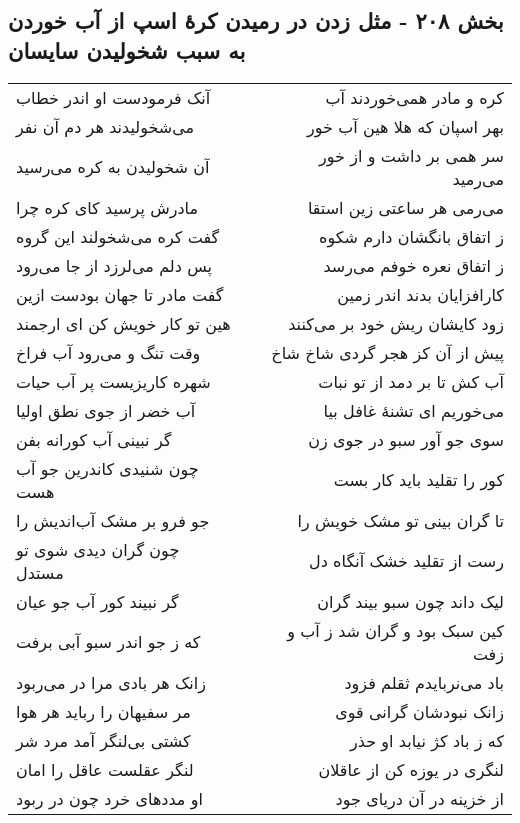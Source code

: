 \begin{center}
\section*{بخش ۲۰۸ - مثل زدن در رمیدن کرهٔ اسپ از آب خوردن به سبب شخولیدن سایسان}
\label{sec:sh208}
\begin{longtable}{l p{0.5cm} r}
آنک فرمودست او اندر خطاب
&&
کره و مادر همی‌خوردند آب
\\
می‌شخولیدند هر دم آن نفر
&&
بهر اسپان که هلا هین آب خور
\\
آن شخولیدن به کره می‌رسید
&&
سر همی بر داشت و از خور می‌رمید
\\
مادرش پرسید کای کره چرا
&&
می‌رمی هر ساعتی زین استقا
\\
گفت کره می‌شخولند این گروه
&&
ز اتفاق بانگشان دارم شکوه
\\
پس دلم می‌لرزد از جا می‌رود
&&
ز اتفاق نعره خوفم می‌رسد
\\
گفت مادر تا جهان بودست ازین
&&
کارافزایان بدند اندر زمین
\\
هین تو کار خویش کن ای ارجمند
&&
زود کایشان ریش خود بر می‌کنند
\\
وقت تنگ و می‌رود آب فراخ
&&
پیش از آن کز هجر گردی شاخ شاخ
\\
شهره کاریزیست پر آب حیات
&&
آب کش تا بر دمد از تو نبات
\\
آب خضر از جوی نطق اولیا
&&
می‌خوریم ای تشنهٔ غافل بیا
\\
گر نبینی آب کورانه بفن
&&
سوی جو آور سبو در جوی زن
\\
چون شنیدی کاندرین جو آب هست
&&
کور را تقلید باید کار بست
\\
جو فرو بر مشک آب‌اندیش را
&&
تا گران بینی تو مشک خویش را
\\
چون گران دیدی شوی تو مستدل
&&
رست از تقلید خشک آنگاه دل
\\
گر نبیند کور آب جو عیان
&&
لیک داند چون سبو بیند گران
\\
که ز جو اندر سبو آبی برفت
&&
کین سبک بود و گران شد ز آب و زفت
\\
زانک هر بادی مرا در می‌ربود
&&
باد می‌نربایدم ثقلم فزود
\\
مر سفیهان را رباید هر هوا
&&
زانک نبودشان گرانی قوی
\\
کشتی بی‌لنگر آمد مرد شر
&&
که ز باد کژ نیابد او حذر
\\
لنگر عقلست عاقل را امان
&&
لنگری در یوزه کن از عاقلان
\\
او مددهای خرد چون در ربود
&&
از خزینه در آن دریای جود
\\

\end{longtable}
\end{center}
